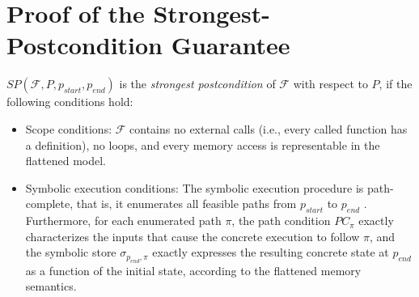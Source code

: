 \section{Proof of the Strongest-Postcondition Guarantee}
\label{app:sp-proof}


\begin{proposition}
\label{thm:sp-sound-complete}
 $\textit{SP}(\mathcal{F},P,p_{\textit{start}},p_{\textit{end}})$ is the \emph{strongest postcondition} of $\mathcal{F}$ with respect to $P$, if the following conditions hold:
 \begin{itemize}
     \item[(A1)] Scope conditions: $\mathcal{F}$ contains no external calls (i.e., every called function has a definition), no loops, and every memory access is representable in the flattened model. 
     \item[(A2)] Symbolic execution conditions: The symbolic execution procedure is path-complete, that is, it enumerates all feasible paths from $p_{\textit{start}}$ to $p_{\textit{end}}$ . Furthermore, for each enumerated path $\pi$, the path condition $PC_\pi$ exactly characterizes the inputs that cause the concrete execution to follow $\pi$, and the symbolic store $\sigma_{p_{\textit{end}},\pi}$ exactly expresses the resulting concrete state at $p_{\textit{end}}$ as a function of the initial state, according to the flattened memory semantics. 
 \end{itemize}
\end{proposition}

